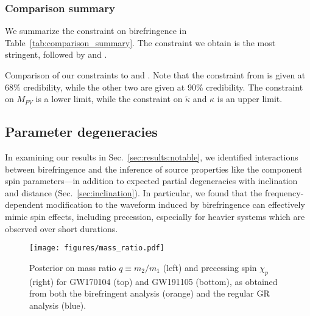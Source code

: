 \documentclass[aps,prd,twocolumn,superscriptaddress,preprintnumbers,floatfix,nofootinbib]{revtex4-2}
\begin{document}
\subsubsection{Comparison summary}

We summarize the constraint on birefringence in Table~\ref{tab:comparison_summary}.
The constraint we obtain is the most stringent, followed by \citet{Okounkova_2022} and \citet{Wang_2021}.

\begin{table}
    \caption{
        Comparison of our constraints to \citet{Okounkova_2022} and \citet{Wang_2021}.
        Note that the constraint from \citet{Okounkova_2022} is given at 68\% credibility, while the other two are given at 90\% credibility.
        The constraint on $M_{PV}$ is a lower limit, while the constraint on $\tilde{\kappa}$ and $\kappa$ is an upper limit.
    }
    \begin{ruledtabular}
    \end{ruledtabular}
    \label{tab:comparison_summary}
\end{table}


\subsection{Parameter degeneracies}
\label{sec:degeneracies}

In examining our results in Sec.~\ref{sec:results:notable}, we identified interactions between birefringence and the inference of source properties like the component spin parameters---in addition to expected partial degeneracies with inclination and distance (Sec.~\ref{sec:inclination}).
In particular, we found that the frequency-dependent modification to the waveform induced by birefringence can effectively mimic spin effects, including precession, especially for heavier systems which are observed over short durations.

\begin{figure}
    \texttt{[image: figures/mass\_ratio.pdf]}
    \caption{
    Posterior on mass ratio $q \equiv m_2/m_1$ (left) and precessing spin $\chi_p$ (right) for GW170104 (top) and GW191105 (bottom), as obtained from both the birefringent analysis (orange) and the regular \ac{GR} analysis (blue).
    }
    \label{fig:mass_ratio}
\end{figure}
\end{document}
